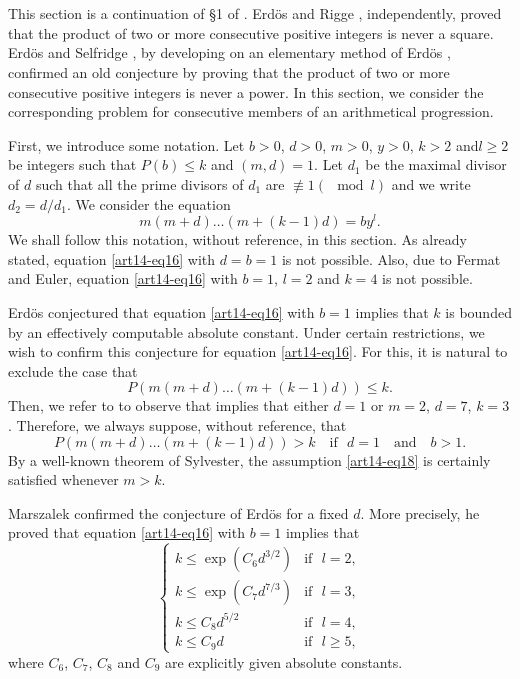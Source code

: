 \section{}\label{art14-sec3}
This section is a continuation of \S1 of \cite{art14-key27}. Erd\"os \cite{art14-key7} and Rigge \cite{art14-key21}, independently, proved that the product of two or more consecutive positive integers is never a square. Erd\"os and Selfridge \cite{art14-key9}, by developing on an elementary method of Erd\"os \cite{art14-key8}, confirmed an old conjecture by proving that the product of two or more consecutive positive integers is never a power. In this section, we consider the corresponding problem for consecutive members of an arithmetical progression.

First, we introduce some notation. Let $b>0$, $d>0$, $m>0$, $y>0$, $k>2$ and\pageoriginale $l\geq 2$ be integers such that $P(b)\leq k$ and $(m,d)=1$. Let $d_{1}$ be the maximal divisor of $d$ such that all the prime divisors of $d_{1}$ are $\nequiv 1(\mod l)$ and we write $d_{2}=d/d_{1}$. We consider the equation
\begin{equation}
m(m+d)\ldots (m+(k-1)d)=by^{l}.\label{art14-eq16}
\end{equation}
We shall follow this notation, without reference, in this section. As already stated, equation \eqref{art14-eq16} with $d=b=1$ is not possible. Also, due to Fermat and Euler, equation \eqref{art14-eq16} with $b=1$, $l=2$ and $k=4$ is not possible.

Erd\"os conjectured that equation \eqref{art14-eq16} with $b=1$ implies that $k$ is bounded by an effectively computable absolute constant. Under certain restrictions, we wish to confirm this conjecture for equation \eqref{art14-eq16}. For this, it is natural to exclude the case that
\begin{equation}
P(m(m+d)\ldots (m+(k-1)d))\leq k.\label{art14-eq17}
\end{equation}
Then, we refer to \cite{art14-key34} to observe that \label{art14-eq17} implies that either $d=1$ or $m=2$, $d=7$, $k=3$. Therefore, we always suppose, without reference, that
\begin{equation}
P(m(m+d)\ldots (m+(k-1)d))>k \quad\text{if~ } d=1\text{~~ and~~ } b>1.\label{art14-eq18}
\end{equation}
By a well-known theorem of Sylvester, the assumption \eqref{art14-eq18} is certainly satisfied whenever $m>k$.

Marszalek \cite{art14-key15} confirmed the conjecture of Erd\"os for a fixed $d$. More precisely, he proved that equation \eqref{art14-eq16} with $b=1$ implies that 
\begin{equation}
\begin{cases}
k\leq \exp (C_{6}d^{3/2}) & \text{if~ }l=2,\\
k\leq \exp (C_{7}d^{7/3}) & \text{if~ }l=3,\\
k\leq C_{8}d^{5/2} & \text{if~ } l=4,\\
k\leq C_{9}d & \text{if~ } l\geq 5,
\end{cases}\label{art14-eq19}
\end{equation}
where $C_{6}$, $C_{7}$, $C_{8}$ and $C_{9}$ are explicitly given absolute constants.

